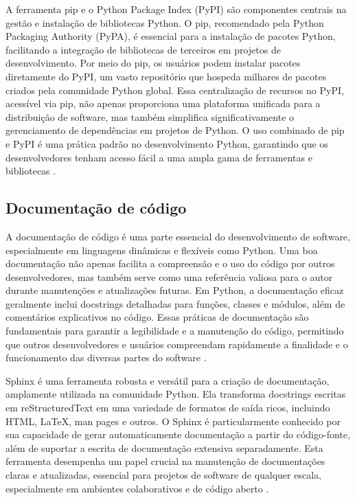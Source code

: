 A ferramenta pip e o Python Package Index (PyPI) são componentes centrais na gestão e instalação de bibliotecas {Python}.
O pip, recomendado pela {Python} Packaging Authority (PyPA), é essencial para a instalação de pacotes {Python},
facilitando a integração de bibliotecas de terceiros em projetos de desenvolvimento.
Por meio do pip, os usuários podem instalar pacotes diretamente do PyPI, um vasto repositório que hospeda milhares de
pacotes criados pela comunidade {Python} global.
Essa centralização de recursos no PyPI, acessível via pip, não apenas proporciona uma plataforma unificada para a
distribuição de software, mas também simplifica significativamente o gerenciamento de dependências em projetos de
{Python}.
O uso combinado de pip e PyPI é uma prática padrão no desenvolvimento Python, garantindo que os desenvolvedores tenham
acesso fácil a uma ampla gama de ferramentas e bibliotecas \cite{pip}.

\subsection{Documentação de código}

A documentação de código é uma parte essencial do desenvolvimento de software, especialmente em linguagens dinâmicas e
flexíveis como Python.
Uma boa documentação não apenas facilita a compreensão e o uso do código por outros desenvolvedores, mas também serve
como uma referência valiosa para o autor durante manutenções e atualizações futuras.
Em Python, a documentação eficaz geralmente inclui docstrings detalhadas para funções, classes e módulos, além de
comentários explicativos no código.
Essas práticas de documentação são fundamentais para garantir a legibilidade e a manutenção do código, permitindo que
outros desenvolvedores e usuários compreendam rapidamente a finalidade e o funcionamento das diversas partes do software
\cite{pydocs}.

Sphinx é uma ferramenta robusta e versátil para a criação de documentação, amplamente utilizada na comunidade Python.
Ela transforma docstrings escritas em reStructuredText em uma variedade de formatos de saída ricos, incluindo HTML,
LaTeX, man pages e outros.
O Sphinx é particularmente conhecido por sua capacidade de gerar automaticamente documentação a partir do código-fonte,
além de suportar a escrita de documentação extensiva separadamente.
Esta ferramenta desempenha um papel crucial na manutenção de documentações claras e atualizadas, essencial para projetos
de software de qualquer escala, especialmente em ambientes colaborativos e de código aberto \cite{sphinx}.

